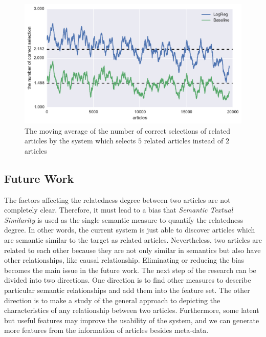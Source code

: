 \begin{figure}[!htb]
    \centering
    \includegraphics[width=\textwidth]{fig/precision_inc_supervised_5}
    \caption[The moving average of the number of correct selection of related articles by the system which selects $5$ related articles]{The moving average of the number of correct selections of related articles by the system which selects $5$ related articles instead of $2$ articles}
    \label{fig:top5}
\end{figure}

\subsection{Future Work}

The factors affecting the relatedness degree between two articles are not completely clear. Therefore, it must lead to a bias that \textit{Semantic Textual Similarity} is used as the single semantic measure to quantify the relatedness degree. In other words, the current system is just able to discover articles which are semantic similar to the target as related articles. Nevertheless, two articles are related to each other because they are not only similar in semantics but also have other relationships, like causal relationship. Eliminating or reducing the bias becomes the main issue in the future work. The next step of the research can be divided into two directions. One direction is to find other measures to describe particular semantic relationships and add them into the feature set. The other direction is to make a study of the general approach to depicting    the characteristics of any relationship between two articles. Furthermore, some latent but useful features may improve the usability of the system, and we can generate more features from the information of articles besides meta-data. 


